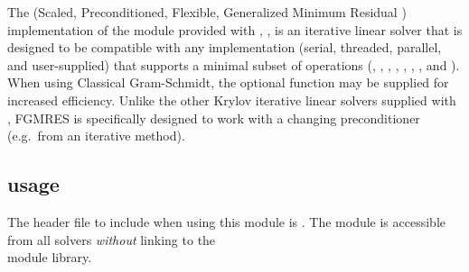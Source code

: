 
The {\spfgmr} (Scaled, Preconditioned, Flexible, Generalized Minimum
Residual \cite{Saa:93}) implementation of the {\sunlinsol} module
provided with {\sundials}, {\sunlinsolspfgmr}, is an iterative linear
solver that is designed to be compatible with any {\nvector}
implementation (serial, threaded, parallel, and user-supplied) that
supports a minimal subset of operations (,
, , , ,
, , and ).  When using
Classical Gram-Schmidt, the optional function 
may be supplied for increased efficiency.  Unlike the other
Krylov iterative linear solvers supplied with {\sundials}, FGMRES is
specifically designed to work with a changing preconditioner
(e.g.~from an iterative method).

\subsection{{\sunlinsolspfgmr} usage}\label{ss:sunlinsol_spfgmr_usage}

The header file to include when using this module
is . The {\sunlinsolspfgmr} module
is accessible from all {\sundials} solvers \textit{without}
linking to the \\ \noindent
{} module library.

